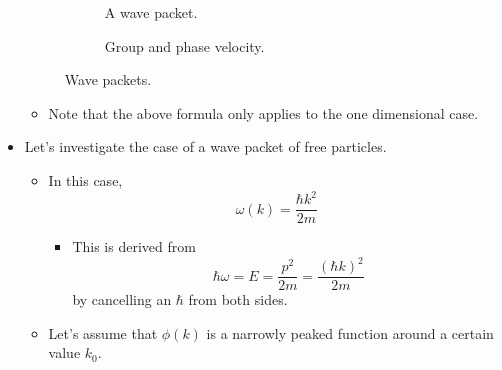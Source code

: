 \documentclass[../notes.tex]{subfiles}
\begin{document}
\begin{itemize}
\begin{figure}[h!]
\begin{subfigure}[b]{0.4\linewidth}
            \caption{A wave packet.}
            \label{fig:wavePacketa}
        \end{subfigure}
        \begin{subfigure}[b]{0.4\linewidth}
            \centering
            \caption{Group and phase velocity.}
            \label{fig:wavePacketb}
        \end{subfigure}
        \caption{Wave packets.}
        \label{fig:wavePacket}
    \end{figure}
    \begin{itemize}
        \item Note that the above formula only applies to the one dimensional case.
    \end{itemize}
    \item Let's investigate the case of a wave packet of free particles.
    \begin{itemize}
        \item In this case,
        \begin{equation*}
            \omega(k) = \frac{\hbar k^2}{2m}
        \end{equation*}
        \begin{itemize}
            \item This is derived from
            \begin{equation*}
                \hbar\omega = E = \frac{p^2}{2m} = \frac{(\hbar k)^2}{2m}
            \end{equation*}
            by cancelling an $\hbar$ from both sides.
        \end{itemize}
        \item Let's assume that $\phi(k)$ is a narrowly peaked function around a certain value $k_0$.

\end{itemize}
\end{itemize}
\end{document}

